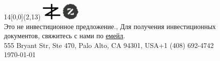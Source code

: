 \documentclass{deck}
\begin{document}
\setlength{\parindent}{0pt} %

\setlength{\fboxsep}{2pt}
\newcommand\point[2]{\vbox{\raggedright\small%
  \fcolorbox{zgreen}{white}{\color{zgreen}#1}\newline%
  \footnotesize#2\vspace{16pt}}}
\newcommand\highlight[1]{\colorbox{zgreen}{\color{white}\thinspace{#1}\thinspace}}

\begin{textblock}{14}[0,0](2,13){
  \color{gray}\footnotesize
  \includegraphics[height=24pt]{../images/zerocracy-logo.pdf}
  \includegraphics[height=24pt]{../images/logo.pdf}\\
  Это не инвестиционное предложение.,
  Для получения инвестиционных документов, свяжитесь с нами по \href{mailto:cio@zerocracy.com}{емейл}.\\
  555 Bryant Str, Ste 470, Palo Alto, CA 94301, USA\quad+1 (408) 692-4742\\
  \today\quad\zoldversion
}\end{textblock}
\end{document}
